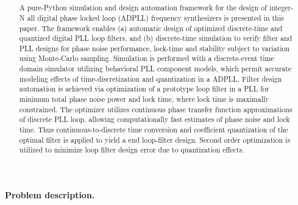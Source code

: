 

\pagestyle{fancy}
\fancyhf{}
\rhead{\fontfamily{\sfdefault}\selectfont \textbf{\rightmark}}

\title{\textbf{}}
\date{}

\sloppy\raggedright
	
	
	\pagebreak
	\thispagestyle{blank}
	\null\pagebreak

	\setcounter{page}{1}
	\pagebreak
	\thispagestyle{nohdr}
	\begin{abstract}
		\large\fontfamily{\rmdefault}\selectfont 
		A pure-Python simulation and design automation framework for the design of integer-N all digital phase locked loop (ADPLL) frequency synthesizers is presented in this paper. The framework enables (a) automatic design of optimized discrete-time and quantized digital PLL loop filters, and (b) discrete-time simulation to verify filter and PLL designs for phase noise performance, lock-time and stability subject to variation using Monte-Carlo sampling. Simulation is performed with a discrete-event time domain simulator utilizing behavioral PLL component models, which permit accurate modeling effects of time-discretization and quantization in a ADPLL. Filter design automation is achieved via optimization of a prototype loop filter in a PLL for minimum total phase noise power and lock time, where lock time is maximally constrained. The optimizer utilizes continuous phase transfer function approximations of discrete PLL loop, allowing computationally fast estimates of phase noise and lock time. Thus continuous-to-discrete time conversion and coefficient quantization of the optimal filter is applied to yield a end loop-filter design. Second order optimization is utilized to minimize loop filter design error due to quantization effects.
	\end{abstract}

	\pagebreak
	\thispagestyle{nohdr}
	\null\pagebreak
	\thispagestyle{nohdr}
	\Huge\textbf{Problem description.}\\
	\vspace{1em}
	\large\fontfamily{\rmdefault}\selectfont 
	
